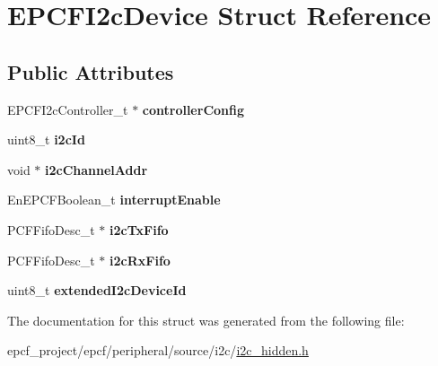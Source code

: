 \hypertarget{structEPCFI2cDevice}{}\section{E\+P\+C\+F\+I2c\+Device Struct Reference}
\label{structEPCFI2cDevice}
\subsection*{Public Attributes}
\begin{DoxyCompactItemize}
\item 
\mbox{\label{structEPCFI2cDevice_aba69dc83d3a2d1320a18bbb930b99fe0}} 
E\+P\+C\+F\+I2c\+Controller\+\_\+t $\ast$ {\bfseries controller\+Config}
\item 
\mbox{\label{structEPCFI2cDevice_a6acfbab9d41e326ed4f161a06c73d56a}} 
uint8\+\_\+t {\bfseries i2c\+Id}
\item 
\mbox{\label{structEPCFI2cDevice_a3787fe74740c14ca7a2388bb3c924cfd}} 
void $\ast$ {\bfseries i2c\+Channel\+Addr}
\item 
\mbox{\label{structEPCFI2cDevice_ac9ca565864c147e9bb7b5627a58a2c8b}} 
En\+E\+P\+C\+F\+Boolean\+\_\+t {\bfseries interrupt\+Enable}
\item 
\mbox{\label{structEPCFI2cDevice_a1e6d72a4bfb36cdc2a2a7c5573b318a7}} 
P\+C\+F\+Fifo\+Desc\+\_\+t $\ast$ {\bfseries i2c\+Tx\+Fifo}
\item 
\mbox{\label{structEPCFI2cDevice_a84aa1c1be42f5d71a71ad3d86201808e}} 
P\+C\+F\+Fifo\+Desc\+\_\+t $\ast$ {\bfseries i2c\+Rx\+Fifo}
\item 
\mbox{\label{structEPCFI2cDevice_a213de0a9083a6b891c2353c3afacba24}} 
uint8\+\_\+t {\bfseries extended\+I2c\+Device\+Id}
\end{DoxyCompactItemize}


The documentation for this struct was generated from the following file\+:\begin{DoxyCompactItemize}
\item 
epcf\+\_\+project/epcf/peripheral/source/i2c/\mbox{\hyperlink{i2c__hidden_8h}{i2c\+\_\+hidden.\+h}}\end{DoxyCompactItemize}
